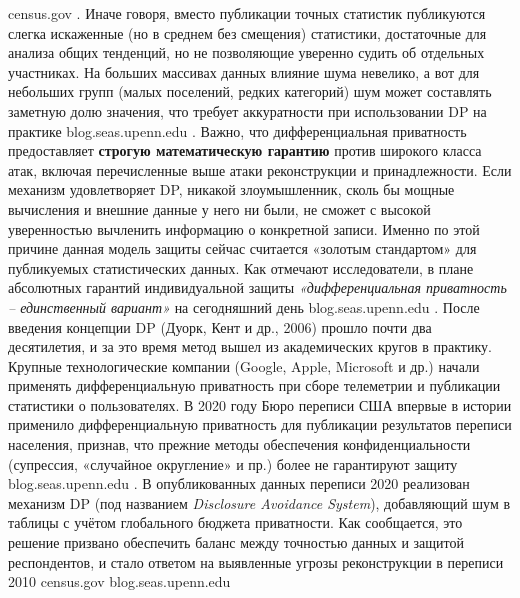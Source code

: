 census.gov
. Иначе говоря, вместо публикации точных статистик публикуются слегка искаженные (но в среднем без смещения) статистики, достаточные для анализа общих тенденций, но не позволяющие уверенно судить об отдельных участниках. На больших массивах данных влияние шума невелико, а вот для небольших групп (малых поселений, редких категорий) шум может составлять заметную долю значения, что требует аккуратности при использовании DP на практике
blog.seas.upenn.edu
. Важно, что дифференциальная приватность предоставляет \textbf{строгую математическую гарантию} против широкого класса атак, включая перечисленные выше атаки реконструкции и принадлежности. Если механизм удовлетворяет DP, никакой злоумышленник, сколь бы мощные вычисления и внешние данные у него ни были, не сможет с высокой уверенностью вычленить информацию о конкретной записи. Именно по этой причине данная модель защиты сейчас считается «золотым стандартом» для публикуемых статистических данных. Как отмечают исследователи, в плане абсолютных гарантий индивидуальной защиты \textit{«дифференциальная приватность – единственный вариант»} на сегодняшний день
blog.seas.upenn.edu
. После введения концепции DP (Дуорк, Кент и др., 2006) прошло почти два десятилетия, и за это время метод вышел из академических кругов в практику. Крупные технологические компании (Google, Apple, Microsoft и др.) начали применять дифференциальную приватность при сборе телеметрии и публикации статистики о пользователях. В 2020 году Бюро переписи США впервые в истории применило дифференциальную приватность для публикации результатов переписи населения, признав, что прежние методы обеспечения конфиденциальности (супрессия, «случайное округление» и пр.) более не гарантируют защиту
blog.seas.upenn.edu
. В опубликованных данных переписи 2020 реализован механизм DP (под названием \textit{Disclosure Avoidance System}), добавляющий шум в таблицы с учётом глобального бюджета приватности. Как сообщается, это решение призвано обеспечить баланс между точностью данных и защитой респондентов, и стало ответом на выявленные угрозы реконструкции в переписи 2010
census.gov
blog.seas.upenn.edu
